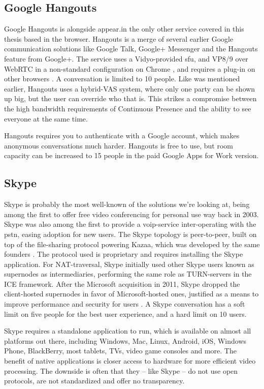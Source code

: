 \subsection{Google Hangouts}

Google Hangouts is alongside appear.in the only other service covered in this thesis based in the browser. Hangouts is a merge of several earlier Google communication solutions like Google Talk, Google+ Messenger and the Hangouts feature from Google+. The service uses a Vidyo-provided \gls{sfu}, and VP8/9 over WebRTC in a non-standard configuration on Chrome \cite{hangouts-webrtc}, and requires a plug-in on other browsers \cite{google-hangouts-support}. A conversation is limited to 10 people. Like was mentioned earlier, Hangouts uses a hybrid-VAS system, where only one party can be shown up big, but the user can override who that is. This strikes a compromise between the high bandwidth requirements of Continuous Presence and the ability to see everyone at the same time.

Hangouts requires you to authenticate with a Google account, which makes anonymous conversations much harder. Hangouts is free to use, but room capacity can be increased to 15 people in the paid Google Apps for Work version.


\subsection{Skype}

Skype is probably the most well-known of the solutions we're looking at, being among the first to offer free video conferencing for personal use way back in 2003. Skype was also among the first to provide a \gls{voip}-service inter-operating with the \gls{pstn}, easing adoption for new users. The Skype topology is peer-to-peer, built on top of the file-sharing protocol powering Kazaa, which was developed by the same founders \cite{skype-history}. The protocol used is proprietary and requires installing the Skype application. For NAT-traversal, Skype initially used other Skype users known as supernodes as intermediaries, performing the same role as TURN-servers in the ICE framework. After the Microsoft acquisition in 2011, Skype dropped the client-hosted supernodes in favor of Microsoft-hosted ones, justified as a means to improve performance and security for users \cite{skype-topo-change}. A Skype conversation has a soft limit on five people for the best user experience, and a hard limit on 10 users.

Skype requires a standalone application to run, which is available on almost all platforms out there, including Windows, Mac, Linux, Android, iOS, Windows Phone, BlackBerry, most tablets, TVs, video game consoles and more. The benefit of native applications is closer access to hardware for more efficient video processing. The downside is often that they -- like Skype -- do not use open protocols, are not standardized and offer no transparency.



